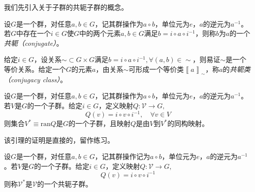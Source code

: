 \documentclass[main.tex]{subfiles}
\begin{document}
我们先引入关于子群的共轭子群的概念。

\begin{definition}\label{def:A.8}
    设$G$是一个群，对任意$a,b\in G$，记其群操作为$a\circ b$，单位元为$e$，$a$的逆元为$a^{-1}$。若$G$中存在一个$i\in G$使$G$中的两个元素$a,b\in G$满足$b=i\circ a\circ i^{-1}$，则称$b$为$a$的一个\emph{共轭（conjugate）}。
\end{definition}

给定$i\in G$，设关系$\sim\subset G\times G$满足$b=i\circ a\circ i^{-1},\forall\left(a,b\right)\in\sim$，则易证$\sim$是一个等价关系。给定一个$G$的元素$a$，由关系$\sim$可形成一个等价类$\left\llbracket a\right\rrbracket_\sim$，称$a$的\emph{共轭类（conjugacy class）}。

\begin{lemma}\label{lem:A.3}
    设$G$是一个群，对任意$a,b\in G$，记其群操作为$a\circ b$，单位元为$e$，$a$的逆元为$a^{-1}$。若$V$是$G$的一个子群。给定$i\in G$，定义映射$Q:\mathcal{V}\rightarrow G,$
    \[Q\left(v\right)=i\circ v\circ i^{-1},\quad\forall v\in V\]
    则集合$V^*\equiv\mathrm{ran}Q$是$G$的一个子群，且映射$Q$是由$V$到$V^*$的同构映射。
\end{lemma}

该引理的证明是直接的，留作练习。

\begin{definition}[共轭子群]\label{def:A.9}
    设$G$是一个群，对任意$a,b\in G$，记其群操作记为$a\circ b$，单位元为$e$，$a$的逆元为$a^{-1}$。若$V$是$G$的一个子群。给定$i\in G$，定义映射$Q:\mathcal{V}\rightarrow G,$
    \[Q\left(v\right)=i\circ v\circ i^{-1}\]
    则称$\mathcal{V}^*$是$\mathcal{V}$的一个共轭子群。
\end{definition}
\end{document}
